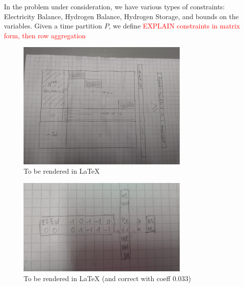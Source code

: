 In the problem under consideration, we have various types of constraints: Electricity Balance, Hydrogen Balance, Hydrogen Storage, and bounds on the variables. 
Given a time partition \(P\), we define \textcolor{red}{EXPLAIN constraints in matrix form, then row aggregation}%


\begin{figure}
    \includegraphics[width=0.75\textwidth]{constraint_matrix.jpeg}
  \caption{To be rendered in LaTeX}
  \end{figure}

 
\begin{figure}
    \includegraphics[width=0.75\textwidth]{single_block.jpeg}
  \caption{To be rendered in LaTeX (and correct with coeff 0.033)}
  \end{figure} 








